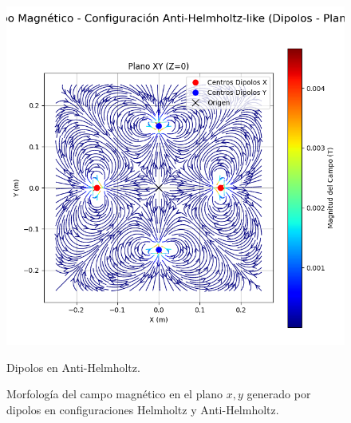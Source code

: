 \begin{figure}[H]
\begin{minipage}[b]{0.48\textwidth}
    \includegraphics[width=\linewidth, trim={0cm 2cm 0cm 1cm}, clip]{Sections/Figures/antihelmholtz_dipoles_xy_field.png} %
    \caption{Dipolos en Anti-Helmholtz.}
    \label{fig:antihelmholtz_dipoles_xy_field}
  \end{minipage}
  \caption{Morfología del campo magnético en el plano $x,y$ generado por dipolos en configuraciones Helmholtz y Anti-Helmholtz.}
  \label{fig:campos_dipolos}
\end{figure}

